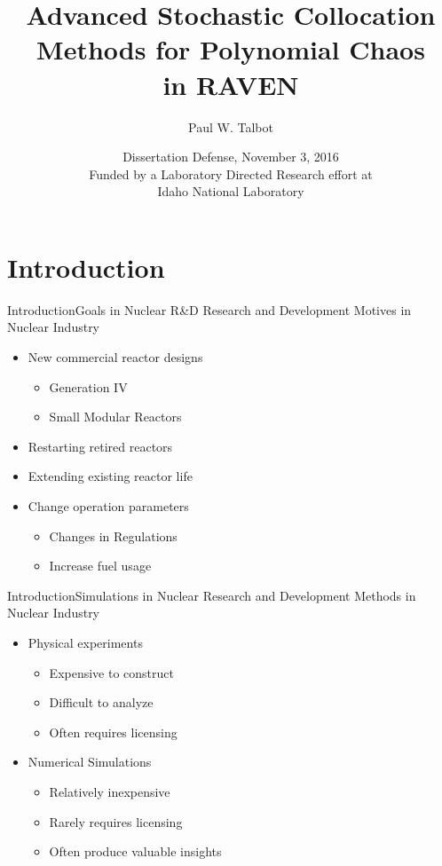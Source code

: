 \documentclass{beamer}
\title[Advanced UQ in RAVEN] %
{Advanced Stochastic Collocation \\Methods for Polynomial Chaos\\ in RAVEN}
\author[Talbot] %
{Paul W. Talbot}%
\institute[University of New Mexico] %
{
  University of New Mexico%
}
\date[Nov. 3 2016] %
{Dissertation Defense, November 3, 2016\\\vspace{10pt}\small Funded by a Laboratory Directed Research effort
at \\Idaho National Laboratory}
\begin{document}
\begin{frame}
  \titlepage
\end{frame}


\section{Introduction}

\begin{frame}{Introduction}{Goals in Nuclear R\&D}\vspace{-20pt}
  \vfill
  Research and Development Motives in Nuclear Industry
  \vfill
  \begin{itemize}
    \item New commercial reactor designs
      \begin{itemize}
        \item Generation IV
        \item Small Modular Reactors
      \end{itemize}
  \vfill
    \item Restarting retired reactors
  \vfill
    \item Extending existing reactor life
  \vfill
    \item Change operation parameters
      \begin{itemize}
        \item Changes in Regulations
        \item Increase fuel usage
      \end{itemize}
  \end{itemize}
  \vfill
\end{frame}

\begin{frame}{Introduction}{Simulations in Nuclear}\vspace{-20pt}
  \vfill
  Research and Development Methods in Nuclear Industry
  \vfill
  \begin{itemize}
    \item Physical experiments
      \begin{itemize}
        \item Expensive to construct
        \item Difficult to analyze
        \item Often requires licensing
      \end{itemize}
  \vfill
    \item Numerical Simulations
      \begin{itemize}
        \item Relatively inexpensive
        \item Rarely requires licensing
        \item Often produce valuable insights
      \end{itemize}
  \end{itemize}
  \vfill
\end{frame}
\end{document}
